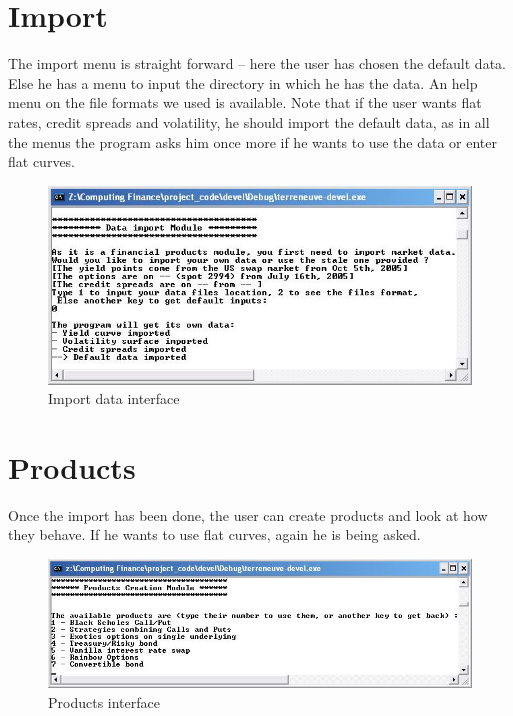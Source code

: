 \section{Import }

The import menu is straight forward -- here the user has chosen the default data. Else he has a menu to input the directory in which he has the data. An help menu on the file formats we used is available. Note that if the user wants flat rates, credit spreads and volatility, he should import the default data, as in all the menus the program asks him once more if he wants to use the data or enter flat curves.

\begin{figure}[htbp]
\begin{center}
        \includegraphics[width=12cm]{importDefault.jpg}
        \caption{Import data interface}
\end{center}
\end{figure}

\section{Products}

Once the import has been done, the user can create products and look at how they behave. If he wants to use flat curves, again he is being asked.

\begin{figure}[htbp]
\begin{center}
        \includegraphics[width=12cm]{products.jpg}
        \caption{Products interface}
\end{center}
\end{figure}

